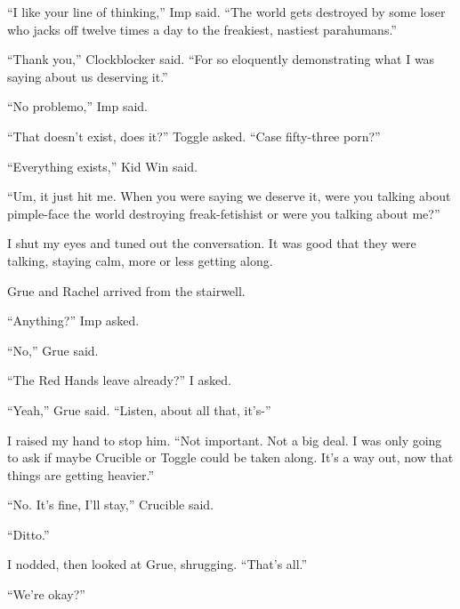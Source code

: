 ``I like your line of thinking,'' Imp said.  ``The world gets destroyed by some loser who jacks off twelve times a day to the freakiest, nastiest parahumans.''



``Thank you,'' Clockblocker said.  ``For so eloquently demonstrating what I was saying about us deserving it.''



``No problemo,'' Imp said.



``That doesn't exist, does it?''  Toggle asked.  ``Case fifty-three porn?''



``Everything exists,'' Kid Win said.



``Um, it just hit me.  When you were saying we deserve it, were you talking about pimple-face the world destroying freak-fetishist or were you talking about me?''



I shut my eyes and tuned out the conversation.  It was good that they were talking, staying calm, more or less getting along.



Grue and Rachel arrived from the stairwell.



``Anything?'' Imp asked.



``No,'' Grue said.



``The Red Hands leave already?'' I asked.



``Yeah,'' Grue said.  ``Listen, about all that, it's-''



I raised my hand to stop him.  ``Not important.  Not a big deal.  I was only going to ask if maybe Crucible or Toggle could be taken along.  It's a way out, now that things are getting heavier.''



``No.  It's fine, I'll stay,'' Crucible said.



``Ditto.''



I nodded, then looked at Grue, shrugging.  ``That's all.''



``We're okay?''



